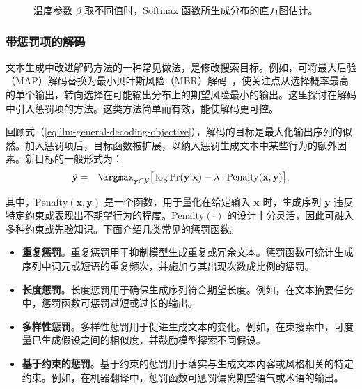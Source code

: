 \begin{figure}[!t]
\centering

\vspace{-0.5cm} \caption{温度参数 $\beta$ 取不同值时，Softmax 函数所生成分布的直方图估计。}
\label{fig:llm-softmax-with-temperature}
\end{figure}


\subsubsection{带惩罚项的解码}

文本生成中改进解码方法的一种常见做法，是修改搜索目标。例如，可将最大后验（MAP）解码替换为最小贝叶斯风险（MBR）解码~\cite{kumar-etal:2004minimum}，使关注点从选择概率最高的单个输出，转向选择在可能输出分布上的期望风险最小的输出。这里探讨在解码中引入惩罚项的方法。这类方法简单而有效，能使解码更可控。

回顾式（\ref{eq:llm-general-decoding-objective}），解码的目标是最大化输出序列的似然。加入惩罚项后，目标函数被扩展，以纳入惩罚生成文本中某些行为的额外因素。新目标的一般形式为：
\begin{eqnarray}
\hat{\mathbf{y}} & = & \argmax_{\mathbf{y} \in \mathcal{Y}} \big[ \log \Pr(\mathbf{y}|\mathbf{x}) - \lambda \cdot \mathrm{Penalty}(\mathbf{x},\mathbf{y}) \big], \label{eq:llm-decoding-objective-with-penalty}
\end{eqnarray}

\noindent 其中，$\mathrm{Penalty}(\mathbf{x},\mathbf{y})$ 是一个函数，用于量化在给定输入 $\mathbf{x}$ 时，生成序列 $\mathbf{y}$ 违反特定约束或表现出不期望行为的程度。$\mathrm{Penalty}(\cdot)$ 的设计十分灵活，因此可融入多种约束或先验知识。下面介绍几类常见的惩罚函数。

\begin{itemize}
\item \vspace{0.5em} \textbf{重复惩罚}。重复惩罚用于抑制模型生成重复或冗余文本。惩罚函数可统计生成序列中词元或短语的重复频次，并施加与其出现次数成比例的惩罚。
\item \vspace{0.3em} \textbf{长度惩罚}。长度惩罚用于确保生成序列符合期望长度。例如，在文本摘要任务中，惩罚函数可惩罚过短或过长的输出。
\item \vspace{0.3em} \textbf{多样性惩罚}。多样性惩罚用于促进生成文本的变化。例如，在束搜索中，可度量已生成假设之间的相似度，并鼓励模型探索不同假设。
\item \vspace{0.3em} \textbf{基于约束的惩罚}。基于约束的惩罚用于落实与生成文本内容或风格相关的特定约束。例如，在机器翻译中，惩罚函数可惩罚偏离期望语气或术语的输出。
\end{itemize}
\vspace{0.5em}

